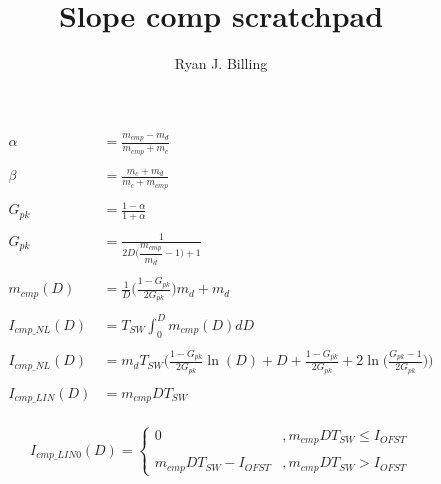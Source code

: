 \documentclass[12pt,letterpaper]{report}
\title{Slope comp scratchpad}
\author{Ryan J. Billing}
\begin{document}
	\maketitle
	
	\begin{align*}
		\alpha &= \frac{m_{cmp} - m_d}{m_{cmp} + m_c} \\
		\\
		\beta &=  \frac{m_c + m_d}{m_c + m_{cmp}} \\
		\\
		G_{pk} &= \frac{1 - \alpha}{1 + \alpha} \\
		\\
		G_{pk} &= \frac{1}{2D\bigg(\dfrac{m_{cmp}}{m_d} - 1 \bigg) + 1} \\
		\\
		m_{cmp} (D) &= \frac{1}{D} \bigg(\frac{1-G_{pk}}{2 G_{pk}}\bigg)m_d + m_d \\
		\\
		I_{cmp\_NL} (D) &= T_{SW}\int_{0}^{D} m_{cmp}(D) dD \\
		\\
		I_{cmp\_NL} (D) &= m_d T_{SW} \bigg( \frac{1 - G_{pk}}{2 G_{pk}} \ln(D) + D + \frac{1-G_{pk}}{2 G_{pk}} + 2 \ln \bigg(\frac{G_{pk} - 1}{2 G_{pk}} \bigg) \bigg)\\
		\\	
		I_{cmp\_LIN} (D) &= m_{cmp} D T_{SW} \\	
	\end{align*}

\begin{equation*}
	I_{cmp\_LIN0} (D) = \begin{cases}
		0& , m_{cmp} D T_{SW} \leq I_{OFST}\\
		\\
		m_{cmp} D T_{SW} - I_{OFST}& , m_{cmp} D T_{SW} > I_{OFST}
	\end{cases} \label{IPK_vs_piecewise} 
\end{equation*}

	 
	
\end{document}
